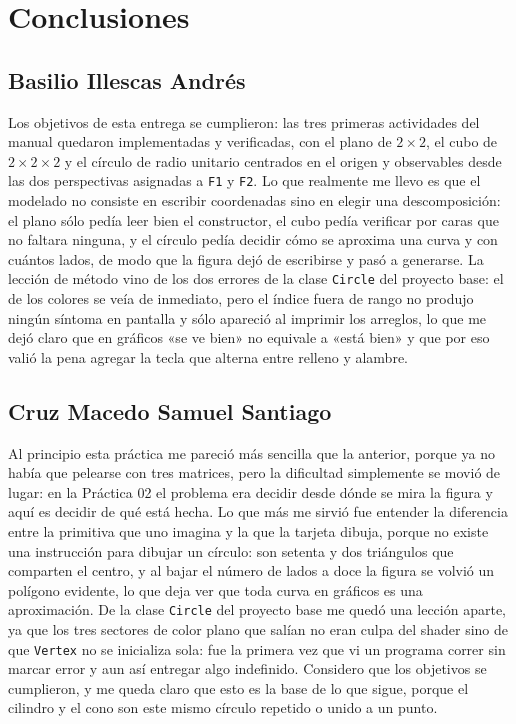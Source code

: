 \section{Conclusiones}

    \subsection{Basilio Illescas Andrés}
    Los objetivos de esta entrega se cumplieron: las tres primeras actividades del manual quedaron implementadas y verificadas, con el plano de $2\times2$, el cubo de $2\times2\times2$ y el círculo de radio unitario centrados en el origen y observables desde las dos perspectivas asignadas a \texttt{F1} y \texttt{F2}. Lo que realmente me llevo es que el modelado no consiste en escribir coordenadas sino en elegir una descomposición: el plano sólo pedía leer bien el constructor, el cubo pedía verificar por caras que no faltara ninguna, y el círculo pedía decidir cómo se aproxima una curva y con cuántos lados, de modo que la figura dejó de escribirse y pasó a generarse. La lección de método vino de los dos errores de la clase \texttt{Circle} del proyecto base: el de los colores se veía de inmediato, pero el índice fuera de rango no produjo ningún síntoma en pantalla y sólo apareció al imprimir los arreglos, lo que me dejó claro que en gráficos «se ve bien» no equivale a «está bien» y que por eso valió la pena agregar la tecla que alterna entre relleno y alambre.

    \subsection{Cruz Macedo Samuel Santiago}
    Al principio esta práctica me pareció más sencilla que la anterior, porque ya no había que pelearse con tres matrices, pero la dificultad simplemente se movió de lugar: en la Práctica 02 el problema era decidir desde dónde se mira la figura y aquí es decidir de qué está hecha. Lo que más me sirvió fue entender la diferencia entre la primitiva que uno imagina y la que la tarjeta dibuja, porque no existe una instrucción para dibujar un círculo: son setenta y dos triángulos que comparten el centro, y al bajar el número de lados a doce la figura se volvió un polígono evidente, lo que deja ver que toda curva en gráficos es una aproximación. De la clase \texttt{Circle} del proyecto base me quedó una lección aparte, ya que los tres sectores de color plano que salían no eran culpa del shader sino de que \texttt{Vertex} no se inicializa sola: fue la primera vez que vi un programa correr sin marcar error y aun así entregar algo indefinido. Considero que los objetivos se cumplieron, y me queda claro que esto es la base de lo que sigue, porque el cilindro y el cono son este mismo círculo repetido o unido a un punto.

